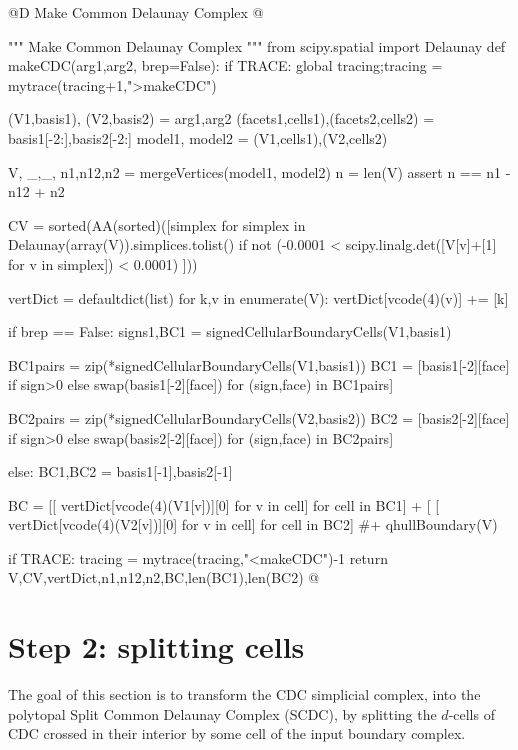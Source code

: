 \documentclass[11pt,oneside]{article}	%
\begin{document}
	
@D Make Common Delaunay Complex
@{""" Make Common Delaunay Complex """
from scipy.spatial import Delaunay
def makeCDC(arg1,arg2, brep=False):
	if TRACE: global tracing;tracing = mytrace(tracing+1,">makeCDC")


	(V1,basis1), (V2,basis2) = arg1,arg2
	(facets1,cells1),(facets2,cells2) = basis1[-2:],basis2[-2:]
	model1, model2 = (V1,cells1),(V2,cells2)

	V, _,_, n1,n12,n2 = mergeVertices(model1, model2)
	n = len(V)
	assert n == n1 - n12 + n2
	
	CV = sorted(AA(sorted)([simplex for simplex in Delaunay(array(V)).simplices.tolist() 
		if not (-0.0001 < scipy.linalg.det([V[v]+[1] for v in simplex]) < 0.0001) ]))
	
	vertDict = defaultdict(list)
	for k,v in enumerate(V): vertDict[vcode(4)(v)] += [k]
	
	if brep == False:
		signs1,BC1 = signedCellularBoundaryCells(V1,basis1)
		
		BC1pairs = zip(*signedCellularBoundaryCells(V1,basis1))
		BC1 = [basis1[-2][face] if sign>0 else swap(basis1[-2][face]) for (sign,face) in BC1pairs]
	
		BC2pairs = zip(*signedCellularBoundaryCells(V2,basis2))
		BC2 = [basis2[-2][face] if sign>0 else swap(basis2[-2][face]) for (sign,face) in BC2pairs] 

	else:
		BC1,BC2 = basis1[-1],basis2[-1]
	
	BC = [[ vertDict[vcode(4)(V1[v])][0] for v in cell] for cell in BC1] + [ 
			[ vertDict[vcode(4)(V2[v])][0] for v in cell] for cell in BC2] #+ qhullBoundary(V)
		

	if TRACE: tracing = mytrace(tracing,"<makeCDC")-1
	return V,CV,vertDict,n1,n12,n2,BC,len(BC1),len(BC2)
@}




\section{Step 2: splitting cells}

The goal of this section is to transform the CDC simplicial complex, into the polytopal Split Common Delaunay Complex (SCDC), by splitting the $d$-cells of CDC crossed in their interior by some cell of the input boundary complex.
\end{document}
